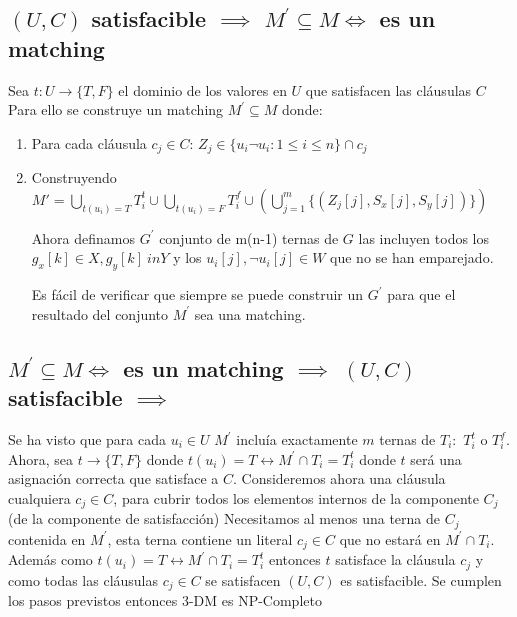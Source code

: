 \documentclass{article}
\begin{document}
\subsection{$(U,C)$ satisfacible $\implies$ $M^{'} \subseteq M \Leftrightarrow$ es un matching }
Sea $t:U\rightarrow \{T,F\}$ el dominio de los valores en $U$ que satisfacen las cláusulas $C$
Para ello se construye un matching $M^{'} \subseteq M $ donde:
\begin{enumerate}
    \item Para cada cláusula $c_j \in C$: $Z_j \in \{u_i \lnot u_i: 1\leq i \leq n \}\cap c_j $
    \item Construyendo $M' = \bigcup_{t(u_i) = T} T^t_i \cup \bigcup_{t(u_i) = F} T^f_i \cup \left( \bigcup_{j=1}^{m} \{ (Z_j[j], S_x[j], S_y[j]) \} \right)$
  
Ahora definamos $G^{'}$ conjunto de m(n-1) ternas de $G$ las incluyen todos los $g_x[k] \in X , g_y[k] \ in Y$
y los $u_i[j], \lnot u_i[j] \in W$ que no se han emparejado.

Es fácil de verificar que siempre se puede construir un $G^{'}$ para que el resultado del conjunto $M^{'}$
sea una matching.

\end{enumerate}

\subsection{$M^{'} \subseteq M \Leftrightarrow$ es un matching $\implies$ $(U,C)$ satisfacible $\implies$ }
Se ha visto que para cada $u_i \in U$ $M^{'}$ incluía exactamente $m$ ternas de $T_i:$ $T^{t}_i$ o $T^{f}_i$.
Ahora, sea $t \rightarrow \{T,F\}$ donde $t(u_i)=T\leftrightarrow  M^{'} \cap T_i=T^{t}_i$  donde $t$ será una asignación correcta
que satisface a $C$.
Consideremos ahora una cláusula cualquiera $c_j \in C$, para cubrir todos los elementos internos de la componente $C_j$(de la componente de satisfacción)
Necesitamos al menos una terna de $C_j$ contenida en $M^{'}$, esta terna contiene un literal $c_j \in C$ que no estará en
$M^{'} \cap T_i$.
Además como $t(u_i)=T\leftrightarrow  M^{'} \cap T_i=T^{t}_i$ entonces $t$ satisface la cláusula $c_j$ y como todas las cláusulas $c_j \in C$
se satisfacen $(U,C)$ es satisfacible. Se cumplen los pasos previstos entonces 3-DM es NP-Completo
\end{document}
